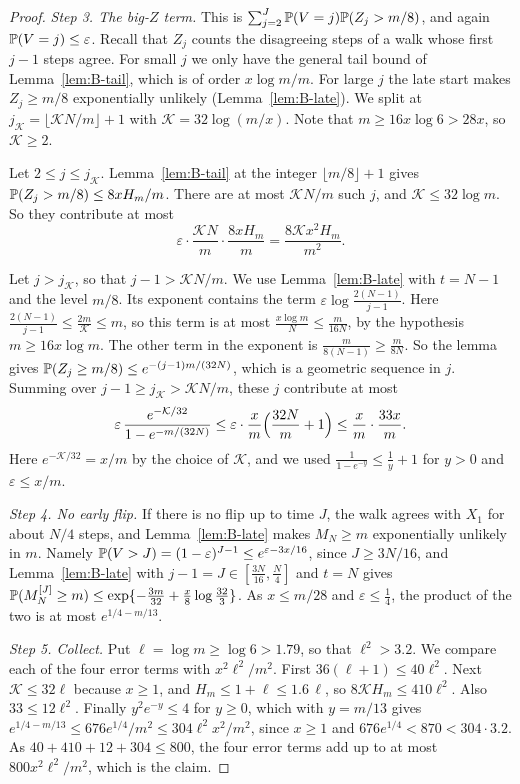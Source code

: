 \begin{proof}
\emph{Step 3. The big-$Z$ term.} This is
$\sum_{j=2}^J\mathbb{P}(V=j)\mathbb{P}(Z_j>m/8)$, and again
$\mathbb{P}(V=j)\le\varepsilon$. Recall that $Z_j$ counts the disagreeing steps
of a walk whose first $j-1$ steps agree. For small $j$ we only have the
general tail bound of Lemma~\ref{lem:B-tail}, which is of order
$x\log m/m$. For large $j$ the late start makes $Z_j\ge m/8$ exponentially
unlikely (Lemma~\ref{lem:B-late}). We split at
$j_{\mathcal K}=\lfloor\mathcal KN/m\rfloor+1$ with
$\mathcal K=32\log(m/x)$. Note that $m\ge16x\log6>28x$, so $\mathcal K\ge2$.

Let $2\le j\le j_{\mathcal K}$. Lemma~\ref{lem:B-tail} at the integer
$\lfloor m/8\rfloor+1$ gives $\mathbb{P}(Z_j>m/8)\le8xH_m/m$. There are at most
$\mathcal KN/m$ such $j$, and $\mathcal K\le32\log m$. So they contribute at
most
\[
 \varepsilon\cdot\frac{\mathcal KN}m\cdot\frac{8xH_m}m
 =\frac{8\mathcal Kx^2H_m}{m^2} .
\]

Let $j>j_{\mathcal K}$, so that $j-1>\mathcal KN/m$. We use
Lemma~\ref{lem:B-late} with $t=N-1$ and the level $m/8$. Its exponent
contains the term $\varepsilon\log\frac{2(N-1)}{j-1}$. Here
$\frac{2(N-1)}{j-1}\le\frac{2m}{\mathcal K}\le m$, so this term is at most
$\frac{x\log m}N\le\frac m{16N}$, by the hypothesis $m\ge16x\log m$. The
other term in the exponent is $\frac m{8(N-1)}\ge\frac m{8N}$. So the lemma
gives $\mathbb{P}(Z_j\ge m/8)\le e^{-(j-1)m/(32N)}$, which is a geometric
sequence in $j$. Summing over $j-1\ge j_{\mathcal K}>\mathcal KN/m$, these
$j$ contribute at most
\[
 \varepsilon\,\frac{e^{-\mathcal K/32}}{1-e^{-m/(32N)}}
 \le\varepsilon\cdot\frac xm\Bigl(\frac{32N}m+1\Bigr)\le\frac xm\cdot\frac{33x}m .
\]
Here $e^{-\mathcal K/32}=x/m$ by the choice of $\mathcal K$, and we used
$\frac1{1-e^{-y}}\le\frac1y+1$ for $y>0$ and $\varepsilon\le x/m$.

\emph{Step 4. No early flip.} If there is no flip up to time $J$, the walk
agrees with $X_1$ for about $N/4$ steps, and Lemma~\ref{lem:B-late} makes
$M_N\ge m$ exponentially unlikely in $m$. Namely
$\mathbb{P}(V>J)=(1-\varepsilon)^{J-1}\le e^{\varepsilon-3x/16}$, since
$J\ge3N/16$, and Lemma~\ref{lem:B-late} with $j-1=J\in[\frac{3N}{16},\frac N4]$
and $t=N$ gives $\mathbb{P}(M^{[J]}_N\ge m)\le\exp\{-\frac{3m}{32}+\frac
x8\log\frac{32}3\}$. As $x\le m/28$ and $\varepsilon\le\frac14$, the product
of the two is at most $e^{1/4-m/13}$.

\emph{Step 5. Collect.} Put $\ell=\log m\ge\log6>1.79$, so that $\ell^2>3.2$. We compare
each of the four error terms with $x^2\ell^2/m^2$. First $36(\ell+1)\le40\ell^2$. Next
$\mathcal K\le32\ell$ because $x\ge1$, and $H_m\le1+\ell\le1.6\,\ell$, so
$8\mathcal KH_m\le410\ell^2$. Also $33\le12\ell^2$. Finally $y^2e^{-y}\le4$ for $y\ge0$, which
with $y=m/13$ gives $e^{1/4-m/13}\le676e^{1/4}/m^2\le304\ell^2x^2/m^2$, since $x\ge1$ and
$676e^{1/4}<870<304\cdot3.2$. As $40+410+12+304\le800$, the four error terms add up to at most
$800x^2\ell^2/m^2$, which is the claim.
\end{proof}

